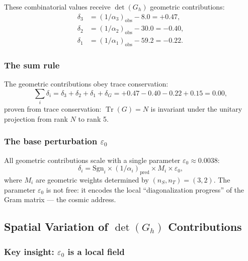 \documentclass[12pt]{article}
\theoremstyle{remark}
\theoremstyle{definition}
\newcommand{\tr}{\operatorname{Tr}}
\begin{document}
These combinatorial values receive $\det(G_h)$ geometric contributions:
\begin{align}
\delta_3 &= (1/\alpha_3)_\text{obs} - 8.0 = +0.47, \\
\delta_2 &= (1/\alpha_2)_\text{obs} - 30.0 = -0.40, \\
\delta_1 &= (1/\alpha_1)_\text{obs} - 59.2 = -0.22.
\end{align}

\subsubsection{The sum rule}

The geometric contributions obey trace conservation:
\begin{equation}
\sum_i \delta_i = \delta_3 + \delta_2 + \delta_1 + \delta_G = +0.47 - 0.40 - 0.22 + 0.15 = 0.00,
\end{equation}
proven from trace conservation: $\tr(G) = N$ is invariant under the unitary projection from rank $N$ to rank 5.

\subsubsection{The base perturbation $\varepsilon_0$}

All geometric contributions scale with a single parameter $\varepsilon_0 \approx 0.0038$:
\begin{equation}
\delta_i = \text{Sgn}_i \times (1/\alpha_i)_\text{pred} \times M_i \times \varepsilon_0,
\end{equation}
where $M_i$ are geometric weights determined by $(n_S, n_T) = (3, 2)$. The parameter $\varepsilon_0$ is not free: it encodes the local ``diagonalization progress'' of the Gram matrix --- the cosmic address.

\subsection{Spatial Variation of $\det(G_h)$ Contributions}

\subsubsection{Key insight: $\varepsilon_0$ is a local field}
\end{document}
